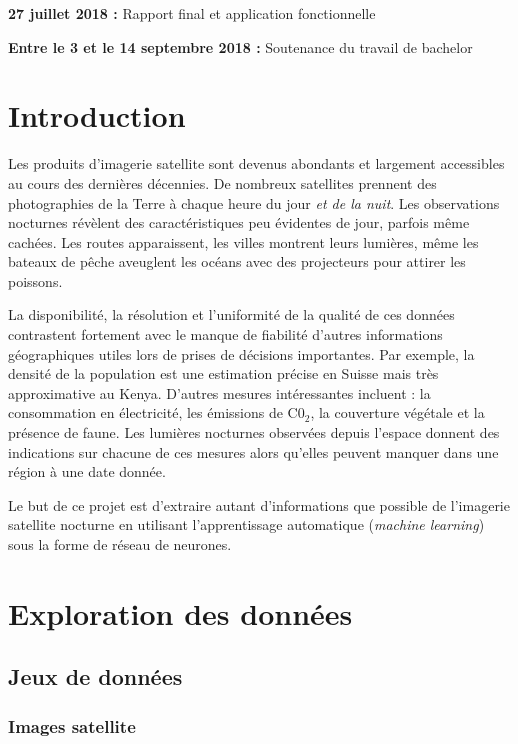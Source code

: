 \documentclass[a4paper, 11pt]{report}
\begin{document}
\textbf{27 juillet 2018 :} Rapport final et application fonctionnelle

\textbf{Entre le 3 et le 14 septembre 2018 :} Soutenance du travail de bachelor



\chapter{Introduction}
Les produits d'imagerie satellite sont devenus abondants et largement accessibles au cours des dernières décennies. De nombreux satellites prennent des photographies de la Terre à chaque heure du jour \textit{et de la nuit}. Les observations nocturnes révèlent des caractéristiques peu évidentes de jour, parfois même cachées. Les routes apparaissent, les villes montrent leurs lumières, même les bateaux de pêche aveuglent les océans avec des projecteurs pour attirer les poissons.

La disponibilité, la résolution et l'uniformité de la qualité de ces données contrastent fortement avec le manque de fiabilité d'autres informations géographiques utiles lors de prises de décisions importantes. Par exemple, la densité de la population est une estimation précise en Suisse mais très approximative au Kenya. D'autres mesures intéressantes incluent : la consommation en électricité, les émissions de C0$_2$, la couverture végétale et la présence de faune. Les lumières nocturnes observées depuis l'espace donnent des indications sur chacune de ces mesures alors qu'elles peuvent manquer dans une région à une date donnée.

Le but de ce projet est d'extraire autant d'informations que possible de l'imagerie satellite nocturne en utilisant l'apprentissage automatique (\textit{machine learning}) sous la forme de réseau de neurones.

\chapter{Exploration des données}
\section{Jeux de données}
\subsection{Images satellite}
\end{document}
